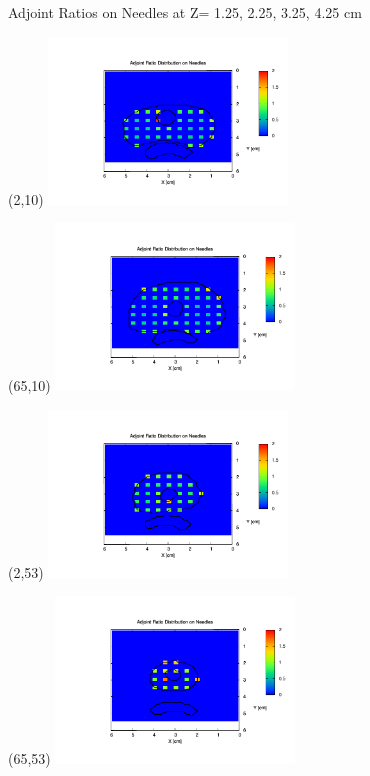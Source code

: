 \documentclass{beamer}
\begin{document}
\begin{frame}{Adjoint Ratios on Needles at Z= 1.25, 2.25, 3.25, 4.25 cm}

  \begin{textblock}{20}(2,10)
    \includegraphics[width=2.5in]{figures/adjoint_ratio_needles-slice3.pdf}
  \end{textblock}

  \begin{textblock}{20}(65,10)
    \includegraphics[width=2.5in]{figures/adjoint_ratio_needles-slice5.pdf}
  \end{textblock}

  \begin{textblock}{20}(2,53)
    \includegraphics[width=2.5in]{figures/adjoint_ratio_needles-slice7.pdf}
  \end{textblock}

  \begin{textblock}{20}(65,53)
    \includegraphics[width=2.5in]{figures/adjoint_ratio_needles-slice9.pdf}
  \end{textblock}
  
\end{frame}
\end{document}
